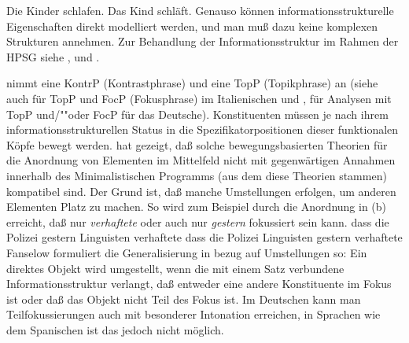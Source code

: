 \eal
\ex Die Kinder schlafen.
\ex Das Kind schläft.
\zl
Genauso können informationsstrukturelle Eigenschaften direkt modelliert
werden, und man muß dazu keine komplexen Strukturen annehmen. Zur Behandlung der
Informationsstruktur im Rahmen der HPSG siehe ,  und
.%



\mbox{}\citet{Frey2004a} nimmt eine KontrP (Kontrastphrase) und 
\citet{Frey2004b-u}
eine TopP (Topikphrase) an (siehe auch  für TopP und FocP (Fokusphrase) im Italienischen und 
,  für Analysen mit TopP und/""oder FocP für das Deutsche).
Konstituenten müssen je nach ihrem informationsstrukturellen Status in die Spezifikatorpositionen
dieser funktionalen Köpfe bewegt werden. \citet{Fanselow2003b} hat gezeigt, daß solche bewegungsbasierten
Theorien für die Anordnung von Elementen im Mittelfeld nicht mit gegenwärtigen Annahmen innerhalb
des Minimalistischen Programms (aus dem diese Theorien stammen) kompatibel sind. Der Grund ist,
daß manche Umstellungen erfolgen, um anderen Elementen Platz zu machen. So wird zum Beispiel
durch die Anordnung in (b) erreicht, daß nur \emph{verhaftete} oder auch nur \emph{gestern}
fokussiert sein kann.
\eal
\ex dass die Polizei gestern Linguisten verhaftete
\ex dass die Polizei Linguisten gestern verhaftete
\zl
Fanselow formuliert die Generalisierung in bezug auf Umstellungen so: Ein direktes Objekt wird
umgestellt, wenn die mit einem Satz verbundene Informationsstruktur verlangt, daß entweder
eine andere Konstituente im Fokus ist oder daß das Objekt nicht Teil des Fokus ist. Im Deutschen
kann man Teilfokussierungen auch mit besonderer Intonation erreichen, in Sprachen wie dem Spanischen
ist das jedoch nicht möglich.

